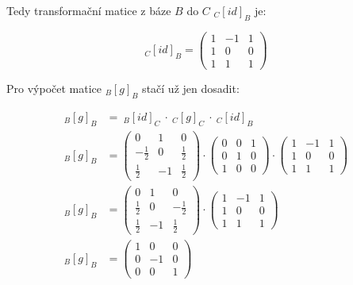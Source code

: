 \documentclass{../../../ksp}
\begin{document}
Tedy transformační matice z báze $B$ do $C$ $_C[id]_B$ je:

\begin{equation}
    _C[id]_B = 
    \begin{pmatrix}
        1 & -1 & 1\\
        1 & 0 & 0\\
        1 & 1 & 1
    \end{pmatrix}
\end{equation}

Pro výpočet matice $_B[g]_B$ stačí už jen dosadit:

\begin{equation}
    \begin{split}
        _B[g]_B & =\ _B[id]_C\ \cdot\ _C[g]_C\ \cdot\ _C[id]_B \\
        _B[g]_B & = 
        \begin{pmatrix}
            0 & 1 & 0\\
            -\frac{1}{2} & 0 & \frac{1}{2}\\
            \frac{1}{2} & -1 & \frac{1}{2}
        \end{pmatrix}
        \cdot
        \begin{pmatrix}
            0 & 0 & 1\\
            0 & 1 & 0\\
            1 & 0 & 0
        \end{pmatrix}
        \cdot 
        \begin{pmatrix}
            1 & -1 & 1\\
            1 & 0 & 0\\
            1 & 1 & 1
        \end{pmatrix} \\
        _B[g]_B & = 
        \begin{pmatrix}
            0 & 1 & 0\\
            \frac{1}{2} & 0 & -\frac{1}{2}\\
            \frac{1}{2} & -1 & \frac{1}{2}
        \end{pmatrix}
        \cdot 
        \begin{pmatrix}
            1 & -1 & 1\\
            1 & 0 & 0\\
            1 & 1 & 1
        \end{pmatrix} \\
        _B[g]_B & = 
        \begin{pmatrix}
            1 & 0 & 0\\
            0 & -1 & 0\\
            0 & 0 & 1
        \end{pmatrix} \\
    \end{split}
\end{equation}
\end{document}
